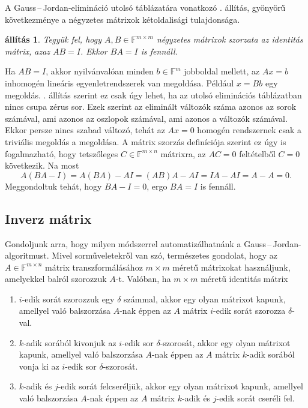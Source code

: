 \documentclass[a4paper, showtrims]{memoir}
\makeatletter
\renewenvironment{proof}[1][\proofname]
    {\par\pushQED{\qed}%
    \normalfont \topsep6\p@\@plus6\p@\relax
    \trivlist
    \item[\hskip\labelsep
        \itshape
    #1\@addpunct{:}]\ignorespaces}
    {\popQED\endtrivlist\@endpefalse}
\theoremstyle{plain}
\newtheorem{proposition}{állítás}[chapter]
\theoremstyle{remark}
\theoremstyle{definition}
\makeatother
\begin{document}
A Gauss\,--\,Jordan-elimináció utolsó táblázatára vonatkozó . állítás, gyönyörű
következménye a négyzetes mátrixok kétoldalisági tulajdonsága.
\begin{proposition}
    Tegyük fel, hogy $A,B\in\mathbb{F}^{m\times m}$ négyzetes mátrixok szorzata az identitás mátrix,
    azaz $AB=I$.
    Ekkor $BA=I$ is fennáll.
    \label{pr:ketoldal}
\end{proposition}
\begin{proof}
    Ha $AB=I$, akkor nyilvánvalóan minden $b\in\mathbb{F}^m$ jobboldal mellett,
    az $Ax=b$ inhomogén lineáris egyenletrendszerek van megoldása. 
    Például $x=Bb$ egy megoldás.
    . állítás szerint ez csak úgy lehet, ha az utolsó eliminációs táblázatban nincs csupa zérus sor.
    Ezek szerint az eliminált változók száma azonos az sorok számával, ami azonos az oszlopok számával, ami azonos a változók számával.
    Ekkor persze nincs szabad változó, tehát az $Ax=0$ homogén rendszernek csak a triviális megoldás a megoldása.
    A mátrix szorzás definíciója szerint ez úgy is fogalmazható, hogy
    tetszőleges $C\in\mathbb{F}^{m\times n}$ mátrixra, az $AC=0$ feltételből $C=0$ következik.
    Na most
    \[
        A\left(BA-I  \right)=A\left( BA \right)-AI=\left( AB \right)A-AI=IA-AI=A-A=0.
    \]
    Meggondoltuk tehát, hogy $BA-I=0$, ergo $BA=I$ is fennáll.
\end{proof}
\subsection{Inverz mátrix}
Gondoljunk arra, hogy milyen módszerrel automatizálhatnánk a Gauss\,--\,Jordan-algoritmust.
Mivel sorműveletekről van szó, természetes gondolat, hogy az $A\in\mathbb{F}^{m\times n}$
mátrix transzformálásához $m\times m$ méretű mátrixokat használjunk,
amelyekkel balról szorozzuk $A$-t.
Valóban, ha $m\times m$ méretű identitás mátrix
\begin{enumerate}
	\item
	      $i$-edik sorát szorozzuk egy $\delta$ számmal,
	      akkor egy olyan mátrixot kapunk,
	      amellyel való balszorzása $A$-nak éppen az $A$ mátrix
	      $i$-edik sorát szorozza $\delta$-val.
	\item
	      $k$-adik sorából kivonjuk az $i$-edik sor $\delta$-szorosát,
	      akkor egy olyan mátrixot kapunk,
	      amellyel való balszorzása $A$-nak éppen az $A$ mátrix
	      $k$-adik sorából vonja ki az $i$-edik sor $\delta$-szorosát.
	\item
	      $k$-adik és $j$-edik sorát felcseréljük,
	      akkor egy olyan mátrixot kapunk,
	      amellyel való balszorzása $A$-nak éppen az $A$ mátrix
	      $k$-adik és $j$-edik sorát cseréli fel.
\end{enumerate}
\end{document}

